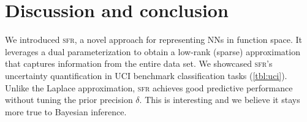 \documentclass{article}
\newcommand{\our}{\textsc{sfr}\xspace}
\begin{document}
\section{Discussion and conclusion}
\label{sec:conclusion}
%
We introduced \our, a novel approach for representing NNs in function space.
It leverages a dual parameterization to obtain a low-rank (sparse) approximation that captures information from the entire data set.
We showcased \our's uncertainty quantification in UCI benchmark classification tasks (\cref{tbl:uci}).
Unlike the Laplace approximation, \our achieves good predictive performance without tuning the prior precision $\delta$.
This is interesting and we believe it stays more true to Bayesian inference.%

\end{document}
